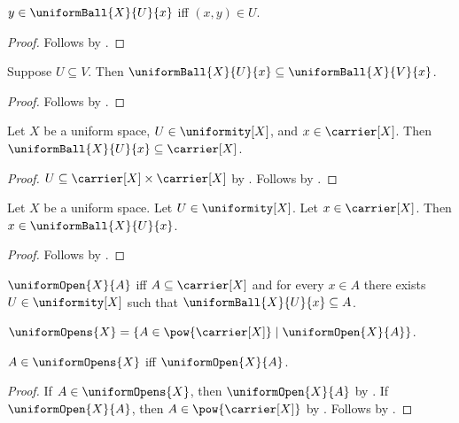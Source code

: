 \begin{proposition}\label{uniform_ball_iff}
    $y\in\uniformBall{X}{U}{x}$ iff $(x,y)\in U$.
\end{proposition}
\begin{proof}
    Follows by .
\end{proof}

\begin{proposition}\label{uniform_ball_monotone}
    Suppose $U\subseteq V$.
    Then $\uniformBall{X}{U}{x}\subseteq\uniformBall{X}{V}{x}$.
\end{proposition}
\begin{proof}
    Follows by .
\end{proof}

\begin{proposition}\label{uniform_ball_subset_carrier}
    Let $X$ be a uniform space, $U\in\uniformity[X]$, and
        $x\in\carrier[X]$.
    Then $\uniformBall{X}{U}{x}\subseteq\carrier[X]$.
\end{proposition}
\begin{proof}
    $U\subseteq\carrier[X]\times\carrier[X]$
        by .
    Follows by
        .
\end{proof}

\begin{proposition}\label{uniform_ball_contains_centre}
    Let $X$ be a uniform space.
    Let $U\in\uniformity[X]$.
    Let $x\in\carrier[X]$.
    Then $x\in\uniformBall{X}{U}{x}$.
\end{proposition}
\begin{proof}
    Follows by
        .
\end{proof}

\begin{definition}\label{uniform_open}
    $\uniformOpen{X}{A}$ iff
        $A\subseteq\carrier[X]$ and
        for every $x\in A$ there exists $U\in\uniformity[X]$ such that
            $\uniformBall{X}{U}{x}\subseteq A$.
\end{definition}

\begin{definition}\label{uniform_opens}
    $\uniformOpens{X}=
        \{A\in\pow{\carrier[X]}\mid\uniformOpen{X}{A}\}$.
\end{definition}

\begin{proposition}\label{uniform_opens_iff}
    $A\in\uniformOpens{X}$ iff $\uniformOpen{X}{A}$.
\end{proposition}
\begin{proof}
    If $A\in\uniformOpens{X}$, then $\uniformOpen{X}{A}$
        by .
    If $\uniformOpen{X}{A}$, then $A\in\pow{\carrier[X]}$
        by .
    Follows by .
\end{proof}

